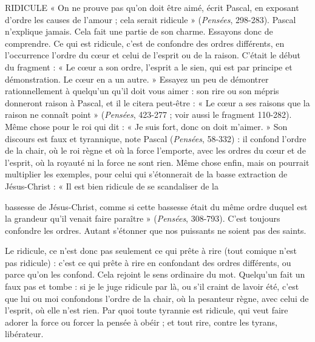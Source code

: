 RIDICULE  « On ne prouve pas qu’on doit être aimé, écrit Pascal, en exposant
d’ordre les causes de l’amour ; cela serait ridicule » ({\it Pensées},
298-283). Pascal n’explique jamais. Cela fait une partie de son charme.
Essayons donc de comprendre. Ce qui est ridicule, c’est de confondre des
ordres différents, en l’occurrence l’ordre du cœur et celui de l'esprit ou de la
raison. C'était le début du fragment : « Le cœur a son ordre, l'esprit a le sien,
qui est par principe et démonstration. Le cœur en a un autre. » Essayez un peu
de démontrer rationnellement à quelqu'un qu’il doit vous aimer : son rire ou
son mépris donneront raison à Pascal, et il le citera peut-être : « Le cœur a ses
raisons que la raison ne connaît point » ({\it Pensées}, 423-277 ; voir aussi le fragment
110-282). Même chose pour le roi qui dit : « Je suis fort, donc on doit
m'aimer. » Son discours est faux et tyrannique, note Pascal ({\it Pensées}, 58-332) :
il confond l’ordre de la chair, où le roi règne et où la force l'emporte, avec les
ordres du cœur et de l’esprit, où la royauté ni la force ne sont rien. Même chose
enfin, mais on pourrait multiplier les exemples, pour celui qui s’étonnerait de
la basse extraction de Jésus-Christ : « Il est bien ridicule de se scandaliser de la

bassesse de Jésus-Christ, comme si cette bassesse était du même ordre duquel
est la grandeur qu’il venait faire paraître » ({\it Pensées}, 308-793). C'est toujours
confondre les ordres. Autant s'étonner que nos puissants ne soient pas des
saints.

Le ridicule, ce n’est donc pas seulement ce qui prête à rire (tout comique
n’est pas ridicule) : c’est ce qui prête à rire en confondant des ordres différents,
ou parce qu’on les confond. Cela rejoint le sens ordinaire du mot. Quelqu'un
fait un faux pas et tombe : si je le juge ridicule par là, ou s’il craint de lavoir
été, c’est que lui ou moi confondons l’ordre de la chair, où la pesanteur règne,
avec celui de l’esprit, où elle n’est rien. Par quoi toute tyrannie est ridicule, qui
veut faire adorer la force ou forcer la pensée à obéir ; et tout rire, contre les
tyrans, libérateur.

